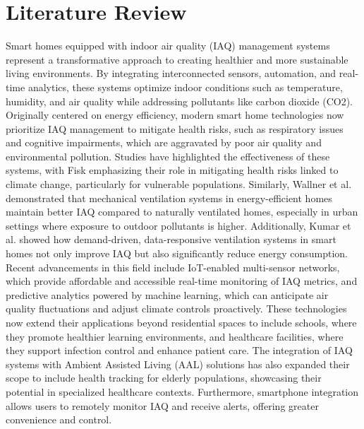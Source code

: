 \documentclass[USenglish,oneside,twocolumn]{article}
\begin{document}
\section{Literature Review}
Smart homes equipped with indoor air quality (IAQ) management systems represent a transformative approach to creating healthier and more sustainable living environments. By integrating interconnected sensors, automation, and real-time analytics, these systems optimize indoor conditions such as temperature, humidity, and air quality while addressing pollutants like carbon dioxide (CO2). Originally centered on energy efficiency, modern smart home technologies now prioritize IAQ management to mitigate health risks, such as respiratory issues and cognitive impairments, which are aggravated by poor air quality and environmental pollution. Studies have highlighted the effectiveness of these systems, with Fisk\cite{ghoneim_2019_towards} emphasizing their role in mitigating health risks linked to climate change, particularly for vulnerable populations. Similarly, Wallner et\cite{wallner_2017_health} al. demonstrated that mechanical ventilation systems in energy-efficient homes maintain better IAQ compared to naturally ventilated homes, especially in urban settings where exposure to outdoor pollutants is higher. Additionally, Kumar et al.\cite{schieweck_2018_smart} showed how demand-driven, data-responsive ventilation systems in smart homes not only improve IAQ but also significantly reduce energy consumption. Recent advancements in this field include IoT-enabled multi-sensor networks, which provide affordable and accessible real-time monitoring of IAQ metrics, and predictive analytics powered by machine learning, which can anticipate air quality fluctuations and adjust climate controls proactively. These technologies now extend their applications beyond residential spaces to include schools, where they promote healthier learning environments, and healthcare facilities, where they support infection control and enhance patient care. The integration of IAQ systems with Ambient Assisted Living (AAL)\cite{das_2022_how} solutions has also expanded their scope to include health tracking for elderly populations, showcasing their potential in specialized healthcare contexts. Furthermore, smartphone integration allows users to remotely monitor IAQ and receive alerts, offering greater convenience and control.
\end{document}
